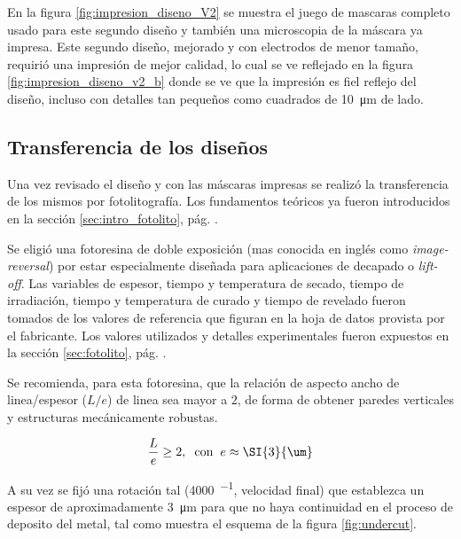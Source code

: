 {		 En la figura \ref{fig:impresion_diseno_V2} se muestra el juego de mascaras completo usado para este segundo diseño y también una microscopia de la máscara ya impresa. Este segundo diseño, mejorado y con electrodos de menor tamaño, requirió una impresión de mejor calidad, lo cual se ve reflejado en la figura \ref{fig:impresion_diseno_v2_b} donde se ve que la impresión es fiel reflejo del diseño, incluso con detalles tan pequeños como cuadrados de \SI{10}{\um} de lado. 
				
 		\subsection{Transferencia de los diseños}

 		 Una vez revisado el diseño y con las máscaras impresas se realizó la transferencia de los mismos por fotolitografía. Los fundamentos teóricos ya fueron introducidos en la sección \ref{sec:intro_fotolito}, pág. \pageref{sec:intro_fotolito}.

 		 Se eligió una fotoresina de doble exposición (mas conocida en inglés como \textit{image-reversal}) por estar especialmente diseñada  para aplicaciones de decapado o \textit{lift-off}. Las variables de espesor, tiempo y temperatura de secado, tiempo de irradiación, tiempo y temperatura de curado y tiempo de revelado fueron tomados de los valores de referencia que figuran en la hoja de datos provista por el fabricante. \cite{TI35E} Los valores utilizados y detalles experimentales fueron expuestos en la sección \ref{sec:fotolito}, pág. \pageref{sec:fotolito}.

 		 Se recomienda, para esta fotoresina, que la relación de aspecto ancho de linea/espesor ($L/e$) de linea sea mayor a $2$, de forma de obtener paredes verticales y estructuras mecánicamente robustas. 

 			\begin{equation}
				\frac{L}{e} \geq 2, \hspace*{0.2cm}\text{con}\hspace{0.2cm}  e \approx \SI{3}{\um}		
 			\end{equation}

 	    	A su vez se fijó una rotación tal (\SI{4000}{\min^{-1}}, velocidad final) que establezca un espesor de aproximadamente \SI{3}{\um} para que no haya continuidad en el proceso de deposito del metal, tal como muestra el esquema de la figura \ref{fig:undercut}.

}
